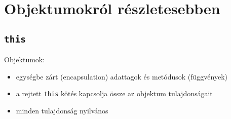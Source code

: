 \section{Objektumokról részletesebben}

\subsection{\texttt{this}}

\begin{frame}
    Objektumok: 
    \begin{itemize}
        \item egységbe zárt (encapsulation) adattagok és metódusok (függvények)
        \item a rejtett \texttt{this} kötés kapcsolja össze az objektum tulajdonságait
        \item minden tulajdonság nyilvános
    \end{itemize}
    \begin{exampleblock}{}
        \small
        
    \end{exampleblock}
\end{frame}

\begin{frame}
    \begin{exampleblock}{}
        \scriptsize
        
    \end{exampleblock}
\end{frame}

\begin{frame}
    \begin{exampleblock}{}
        \small
        
    \end{exampleblock}
\end{frame}

\begin{frame}
    \begin{exampleblock}{}
        \small
        
    \end{exampleblock}
\end{frame}

